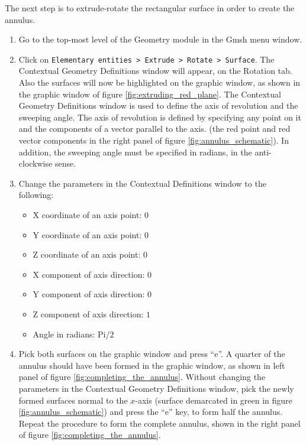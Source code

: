\par
The next step is to extrude-rotate the rectangular surface in order to create the annulus.
\begin{enumerate}
  \item Go to the top-most level of the Geometry module in the Gmsh menu window.
  \item Click on \lstinline+Elementary entities > Extrude > Rotate > Surface+. The
        Contextual Geometry Definitions window will appear, on the Rotation tab. Also the surfaces will
        now be highlighted on the graphic window, as shown in the graphic window of figure
        \ref{fig:extruding_red_plane}. The Contextual Geometry Definitions window is used to define
        the axis of revolution and the sweeping angle. The axis of revolution is defined by specifying any
        point on it and the components of a vector parallel to the axis. (\eg the red point and red vector
        components in the right panel of figure \ref{fig:annulus_schematic}). In addition, the sweeping angle
        must be specified in radians, in the anti-clockwise sense.
  \item Change the parameters in the Contextual Definitions window to the following:
  \begin{itemize}
    \item X coordinate of an axis point: $0$
    \item Y coordinate of an axis point: $0$
    \item Z coordinate of an axis point: $0$
    \item X component  of axis direction: $0$
    \item Y component  of axis direction: $0$
    \item Z component  of axis direction: $1$
    \item Angle in radians: Pi/$2$
  \end{itemize}
  \item Pick both surfaces on the graphic window and press ``e''. A quarter of the annulus should have been
        formed in the graphic window, as shown in left panel of figure \ref{fig:completing_the_annulus}. 
        Without changing the parameters in the Contextual Geometry Definitions
        window, pick the newly formed surfaces normal to the $x$-axis (surface demarcated in green in figure
        \ref{fig:annulus_schematic}) and press the ``e'' key, to form half the annulus. Repeat the
        procedure to form the complete annulus, shown in the right panel of figure
        \ref{fig:completing_the_annulus}. 
\end{enumerate}
